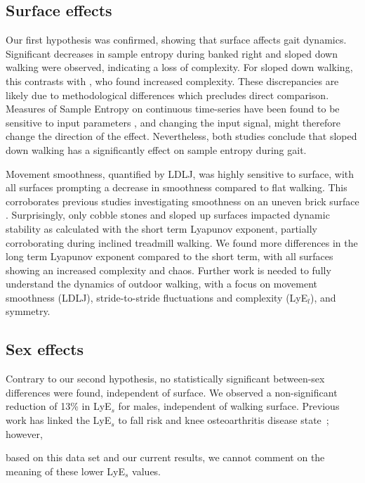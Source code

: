 \documentclass[authoryear,preprint,review,12pt]{elsarticle}
\begin{document}
\subsection{Surface effects}
Our first hypothesis was confirmed, showing that surface affects gait dynamics. Significant decreases in sample entropy during banked right and sloped down walking were observed, indicating a loss of complexity. For sloped down walking, this contrasts with \cite{vieira_gait_2017}, who found increased complexity. These discrepancies are likely due to methodological differences which precludes direct comparison. Measures of Sample Entropy on continuous time-series have been found to be sensitive to input parameters \citep{mccamley2018calculation}, and changing the input signal, might therefore change the direction of the effect. Nevertheless, both studies conclude that sloped down walking has a significantly effect on sample entropy during gait.

Movement smoothness, quantified by LDLJ, was highly sensitive to surface, with all surfaces prompting a decrease in smoothness compared to flat walking. This corroborates previous studies investigating smoothness on an uneven brick surface \citep{dixon_late-cueing_2018}. 
Surprisingly, only cobble stones and sloped up surfaces impacted dynamic stability as calculated with the short term Lyapunov exponent, partially corroborating \cite{vieira_gait_2017} during inclined treadmill walking.
We found more differences in the long term Lyapunov exponent compared to the short term, with all surfaces showing an increased complexity and chaos. Further work is needed to fully understand the dynamics of outdoor walking, with a focus on movement smoothness (LDLJ), stride-to-stride fluctuations and complexity (LyE$_{l}$), and symmetry. 

\subsection{Sex effects}
Contrary to our second hypothesis, no statistically significant between-sex differences were found, independent of surface. We observed a non-significant reduction of 13\%  in LyE${_s}$ for males, independent of walking surface. Previous work has linked the LyE${_s}$ to fall risk and knee osteoarthritis disease state~\citep{bruijn2013assessing, emmerzaal_movement_2022}; however, 

based on this data set and our current results, we cannot comment on the meaning of these lower LyE$_{s}$ values. 
\end{document}
